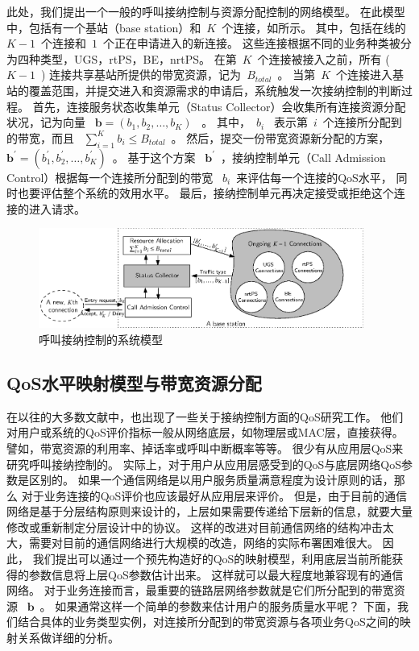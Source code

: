 此处，我们提出一个一般的呼叫接纳控制与资源分配控制的网络模型。
在此模型中，包括有一个基站（base station）和~$K$~个连接，如所示。
其中，包括在线的~$K-1$~个连接和~$1$~个正在申请进入的新连接。
这些连接根据不同的业务种类被分为四种类型，UGS，rtPS，BE，nrtPS。
在第~$K$~个连接被接入之前，所有 (~$K-1$~) 连接共享基站所提供的带宽资源，记为~$B_{total}$~。
当第~$K$~个连接进入基站的覆盖范围，并提交进入和资源需求的申请后，系统触发一次接纳控制的判断过程。
首先，连接服务状态收集单元（Status Collector）会收集所有连接资源分配状况，记为向量 ~$\mathbf{b} = (b_1, b_2, \dots, b_{K})$~ 。
其中，~$b_i$~ 表示第~$i$~个连接所分配到的带宽，而且 ~$\sum_{i=1}^K b_i \le B_{total}$~。
然后，提交一份带宽资源新分配的方案，~$\mathbf{b^\prime} = (b_1^\prime, b_2^\prime, \dots, b_K^\prime)$~。
基于这个方案 ~$\mathbf{b^\prime}$~，接纳控制单元（Call Admission Control）根据每一个连接所分配到的带宽 ~$b_i$~来评估每一个连接的QoS水平，
同时也要评估整个系统的效用水平。
最后，接纳控制单元再决定接受或拒绝这个连接的进入请求。
\begin{figure}[t]
\centering
\includegraphics[width=0.95\textwidth]{cacop_qos_model_system.eps}
\caption{ 呼叫接纳控制的系统模型} \label{fig_system_model_cac}
\end{figure}
\subsection{QoS水平映射模型与带宽资源分配}
在以往的大多数文献中，也出现了一些关于接纳控制方面的QoS研究工作。
他们对用户或系统的QoS评价指标一般从网络底层，如物理层或MAC层，直接获得。
譬如，带宽资源的利用率、掉话率或呼叫中断概率等等。
很少有从应用层QoS来研究呼叫接纳控制的。
实际上，对于用户从应用层感受到的QoS与底层网络QoS参数是区别的。
如果一个通信网络是以用户服务质量满意程度为设计原则的话，那么
对于业务连接的QoS评价也应该最好从应用层来评价。
但是，由于目前的通信网络是基于分层结构原则来设计的，上层如果需要传递给下层新的信息，就要大量修改或重新制定分层设计中的协议。
这样的改进对目前通信网络的结构冲击太大，需要对目前的通信网络进行大规模的改造，网络的实际布署困难很大。
因此，
我们提出可以通过一个预先构造好的QoS的映射模型，利用底层当前所能获得的参数信息将上层QoS参数估计出来。
这样就可以最大程度地兼容现有的通信网络。
对于业务连接而言，最重要的链路层网络参数就是它们所分配到的带宽资源 ~$\mathbf{b}$~。
如果通常这样一个简单的参数来估计用户的服务质量水平呢？ 
下面，我们结合具体的业务类型实例，对连接所分配到的带宽资源与各项业务QoS之间的映射关系做详细的分析。


